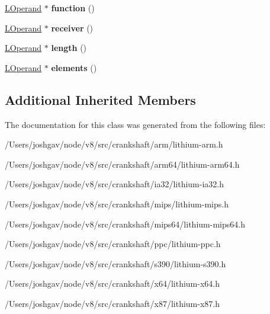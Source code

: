 \begin{DoxyCompactItemize}
\item 
\hyperlink{classv8_1_1internal_1_1_l_operand}{L\+Operand} $\ast$ {\bfseries function} ()\hypertarget{classv8_1_1internal_1_1_l_apply_arguments_af7fa90a86d06b14c9991f9c68115415b}{}\label{classv8_1_1internal_1_1_l_apply_arguments_af7fa90a86d06b14c9991f9c68115415b}

\item 
\hyperlink{classv8_1_1internal_1_1_l_operand}{L\+Operand} $\ast$ {\bfseries receiver} ()\hypertarget{classv8_1_1internal_1_1_l_apply_arguments_a6cd58169b6ce998cb4a7fadaebdf8ae5}{}\label{classv8_1_1internal_1_1_l_apply_arguments_a6cd58169b6ce998cb4a7fadaebdf8ae5}

\item 
\hyperlink{classv8_1_1internal_1_1_l_operand}{L\+Operand} $\ast$ {\bfseries length} ()\hypertarget{classv8_1_1internal_1_1_l_apply_arguments_a7184d82b892039d6cd4cae3b4d9f3f9d}{}\label{classv8_1_1internal_1_1_l_apply_arguments_a7184d82b892039d6cd4cae3b4d9f3f9d}

\item 
\hyperlink{classv8_1_1internal_1_1_l_operand}{L\+Operand} $\ast$ {\bfseries elements} ()\hypertarget{classv8_1_1internal_1_1_l_apply_arguments_acb08ae582ad76ef25684e2361409c0e4}{}\label{classv8_1_1internal_1_1_l_apply_arguments_acb08ae582ad76ef25684e2361409c0e4}

\end{DoxyCompactItemize}
\subsection*{Additional Inherited Members}


The documentation for this class was generated from the following files\+:\begin{DoxyCompactItemize}
\item 
/\+Users/joshgav/node/v8/src/crankshaft/arm/lithium-\/arm.\+h\item 
/\+Users/joshgav/node/v8/src/crankshaft/arm64/lithium-\/arm64.\+h\item 
/\+Users/joshgav/node/v8/src/crankshaft/ia32/lithium-\/ia32.\+h\item 
/\+Users/joshgav/node/v8/src/crankshaft/mips/lithium-\/mips.\+h\item 
/\+Users/joshgav/node/v8/src/crankshaft/mips64/lithium-\/mips64.\+h\item 
/\+Users/joshgav/node/v8/src/crankshaft/ppc/lithium-\/ppc.\+h\item 
/\+Users/joshgav/node/v8/src/crankshaft/s390/lithium-\/s390.\+h\item 
/\+Users/joshgav/node/v8/src/crankshaft/x64/lithium-\/x64.\+h\item 
/\+Users/joshgav/node/v8/src/crankshaft/x87/lithium-\/x87.\+h\end{DoxyCompactItemize}
